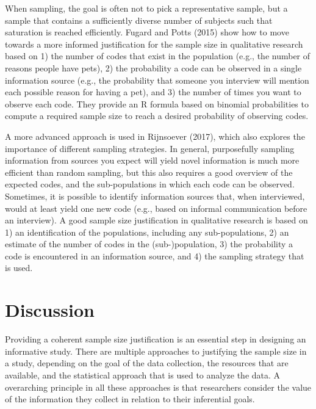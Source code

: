 \documentclass[
  english,
  ,jou, a4paper,floatsintext]{apa6}
\begin{document}
When sampling, the goal is often not to pick a representative sample, but a sample that contains a sufficiently diverse number of subjects such that saturation is reached efficiently. Fugard and Potts (2015) show how to move towards a more informed justification for the sample size in qualitative research based on 1) the number of codes that exist in the population (e.g., the number of reasons people have pets), 2) the probability a code can be observed in a single information source (e.g., the probability that someone you interview will mention each possible reason for having a pet), and 3) the number of times you want to observe each code. They provide an R formula based on binomial probabilities to compute a required sample size to reach a desired probability of observing codes.

A more advanced approach is used in Rijnsoever (2017), which also explores the importance of different sampling strategies. In general, purposefully sampling information from sources you expect will yield novel information is much more efficient than random sampling, but this also requires a good overview of the expected codes, and the sub-populations in which each code can be observed. Sometimes, it is possible to identify information sources that, when interviewed, would at least yield one new code (e.g., based on informal communication before an interview). A good sample size justification in qualitative research is based on 1) an identification of the populations, including any sub-populations, 2) an estimate of the number of codes in the (sub-)population, 3) the probability a code is encountered in an information source, and 4) the sampling strategy that is used.

\hypertarget{discussion}{%
\section{Discussion}\label{discussion}}

Providing a coherent sample size justification is an essential step in designing an informative study. There are multiple approaches to justifying the sample size in a study, depending on the goal of the data collection, the resources that are available, and the statistical approach that is used to analyze the data. A overarching principle in all these approaches is that researchers consider the value of the information they collect in relation to their inferential goals.
\end{document}
